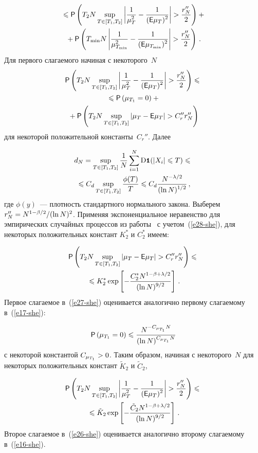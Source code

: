 \begin{multicols}{2}
\begin{multline}
{}\leqslant{\sf P}\left(T_2N\sup\limits_{T\in[T_1,T_2]}\left\vert\displaystyle\frac{\displaystyle 1\mathstrut}{\displaystyle \mu^2_T\mathstrut}-\displaystyle\frac{\displaystyle 1\mathstrut}{\displaystyle ({\sf E}\mu_T)^2\mathstrut}\right\vert>
\displaystyle\frac{\displaystyle r''_N\mathstrut}{\displaystyle 2\mathstrut}\right)+{}\\
{}+{\sf P}\left(T_{\min}N\left\vert\displaystyle\frac{\displaystyle 1\mathstrut}{\displaystyle \mu^2_{T_{\min}}\mathstrut}-\displaystyle\frac{\displaystyle 1\mathstrut}{\displaystyle ({\sf E}\mu_{T_{\min}})^2\mathstrut}\right\vert>
\displaystyle\frac{\displaystyle r''_N\mathstrut}{\displaystyle 2\mathstrut}\right)\,.\label{e26-she}
\end{multline}
Для первого слагаемого начиная с некоторого~$N$
\begin{multline}
{\sf P}\left(T_2N\sup\limits_{T\in[T_1,T_2]}\left\vert\displaystyle\frac{\displaystyle 1\mathstrut}{\displaystyle \mu^2_T\mathstrut}-\displaystyle\frac{\displaystyle 1\mathstrut}{\displaystyle ({\sf E}\mu_T)^2\mathstrut}\right\vert>
\displaystyle\frac{\displaystyle r''_N\mathstrut}{\displaystyle 2\mathstrut}\right)\leqslant{}\\
{}\leqslant{\sf P}\left(\mu_{T_1}=0\right)+{}\\
{}+{\sf P}\left(T_2N\sup\limits_{T\in[T_1,T_2]}
\left\vert\mu_T-{\sf E}\mu_T\right\vert>C_r'' r''_N\right)\label{e27-she}
\end{multline}
для некоторой положительной константы~$C_r''$. Далее

\noindent
\begin{multline}
d_N=\sup\limits_{T\in[T_1,T_2]}\displaystyle\frac{\displaystyle 1\mathstrut}{\displaystyle N\mathstrut}\sum\limits_{i=1}^{N}\mathrm{D}\mbox{{\small \tt {1}}\hspace{-1.5mm}{\tt 1}}(\left\vert X_i\right\vert\leqslant T)
\leqslant{}\\
{}\leqslant C_d\sup\limits_{T\in[T_1,T_2]}\displaystyle\frac{\displaystyle \phi(T)\mathstrut}{\displaystyle T\mathstrut}\leqslant C_d\displaystyle\frac{\displaystyle N^{-\lambda/2}\mathstrut}{\displaystyle (\ln N)^{1/2}\mathstrut}\,,\label{e28-she}
\end{multline}
где $\phi(y)$~--- плотность стандартного нормального закона. Выберем $r''_N\hm=N^{1-\beta/2}/(\ln N)^2$. 
Применяя экспоненциальное неравенство для эмпирических случайных процессов из работы~\cite{18-she}
с учетом~(\ref{e28-she}), для некоторых положительных констант $K^{*}_2$ и $C^{*}_2$ имеем:

\noindent
\begin{multline*}
{\sf P}\left(T_2N\sup\limits_{T\in[T_1,T_2]}\left\vert\mu_T-{\sf E}\mu_T\right\vert>C_r'' r''_N\right)\leqslant {}\\
{}\leqslant
K^{*}_2\exp\left[-\displaystyle\frac{\displaystyle C^{*}_2 N^{1-\beta+\lambda/2}\mathstrut}{\displaystyle (\ln N)^{9/2}\mathstrut}\right]\,.
\end{multline*}
Первое слагаемое в~(\ref{e27-she}) оценивается аналогично первому слагаемому в~(\ref{e17-she}):

\noindent
$$
{\sf P}\left(\mu_{T_1}=0\right)\leqslant \displaystyle\frac{\displaystyle N^{-C_{\mu_{T_1}}N}\mathstrut}{\displaystyle (\ln N)^{C_{\mu_{T_1}}N}\mathstrut}
$$
с некоторой константой $C_{\mu_{T_1}}\hm>0$. Таким образом, начиная с некоторого~$N$ для 
некоторых положительных констант $\tilde{K}_2$ и $\tilde{C}_2$,

\noindent
\begin{multline}
{\sf P}\left(T_2N\sup\limits_{T\in[T_1,T_2]}\abs{\fr{1}{\mu^2_T}-\fr{1}{({\sf E}\mu_T)^2}}>
\fr{r''_N}{2}\right)\leqslant{}\\
{}\leqslant \tilde{K}_2\exp\left[-\fr{\tilde{C}_2 N^{1-\beta+\lambda/2}}{(\ln N)^{9/2}}\right]\,.
\label{e29-she}
\end{multline}
Второе слагаемое в~(\ref{e26-she}) оценивается аналогично второму слагаемому в~(\ref{e16-she}).


\end{multicols}

